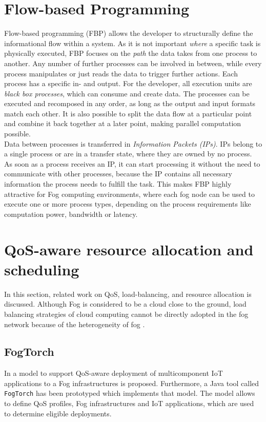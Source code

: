 \section{Flow-based Programming}
Flow-based programming (FBP) allows the developer to structurally define the informational flow within a system.
As it is not important \textit{where} a specific task is physically executed, FBP focuses on the \textit{path} the data takes from one process to another.
Any number of further processes can be involved in between, while every process manipulates or just reads the data to trigger further actions. Each process has a specific in- and output.
For the developer, all execution units are \textit{black box processes}, which can consume and create data.
The processes can be executed and recomposed in any order, as long as the output and input formats match each other.
It is also possible to split the data flow at a particular point and combine it back together at a later point, making parallel computation possible.\\

Data between processes is transferred in \textit{Information Packets (IPs)}.
IPs belong to a single process or are in a transfer state, where they are owned by no process.
As soon as a process receives an IP, it can start processing it without the need to communicate with other processes, because the IP contains all necessary information the process needs to fulfill the task.
This makes FBP highly attractive for Fog computing environments, where each fog node can be used to execute one or more process types, depending on the process requirements like computation power, bandwidth or latency.

\section{QoS-aware resource allocation and scheduling}
In this section, related work on QoS, load-balancing, and resource allocation is discussed. Although Fog is considered to be a cloud close to the ground, load balancing strategies of cloud computing cannot be directly adopted in the fog network because of the heterogeneity of fog \cite{novel-load-balancing}.

\subsection*{FogTorch}
In \cite{fogtorch} a model to support QoS-aware deployment of multicomponent IoT applications to a Fog infrastructures is proposed. Furthermore, a Java tool called \texttt{FogTorch} has been prototyped which implements that model. The model allows to define QoS profiles, Fog infrastructures and IoT applications, which are used to determine eligible deployments.\\

